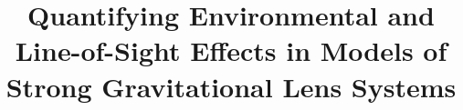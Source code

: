\title[Environmental and LOS Effects in Lens Models]{Quantifying Environmental and Line-of-Sight Effects in Models of Strong Gravitational Lens Systems}
  
  